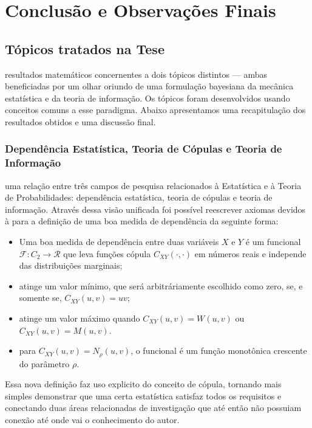 \chapter{Conclusão e Observações Finais}
\section{Tópicos tratados na Tese}

 resultados matemáticos concernentes a dois tópicos distintos --- ambas beneficiadas por um olhar oriundo de uma formulação bayesiana da mecânica estatística e da teoria de informação. Os tópicos foram desenvolvidos usando conceitos comuns a esse paradigma. Abaixo apresentamos uma recapitulação dos resultados obtidos e uma discussão final.

\subsection{Dependência Estatística, Teoria de Cópulas e Teoria de Informação}

 uma relação entre três campos de pesquisa relacionados à Estatística e à Teoria de Probabilidades: dependência estatística, teoria de cópulas e teoria de informação. Através dessa visão unificada foi possível reescrever axiomas devidos à \citet{Renyi1959} para a definição de uma boa medida de dependência da seguinte forma:
\begin{itemize}
\item Uma boa medida de dependência entre duas variáveis $X$ e $Y$ é um funcional $\mathcal{F} : C_{2} \to \mathcal{R}$ que leva funções cópula $C_{XY}(\cdot, \cdot)$ em números reais e independe das distribuições marginais;
\item atinge um valor mínimo, que será arbitráriamente escolhido como zero, se, e somente se, $C_{XY}(u,v) = uv$;
\item atinge um valor máximo quando $C_{XY}(u,v) = W(u,v)$ ou $C_{XY}(u,v) = M(u,v)$.
\item para $C_{XY}(u,v) = N_{\rho}(u,v)$, o funcional é um função monotônica crescente do parâmetro  $\rho$. 
\end{itemize}
Essa nova definição faz uso explicito do conceito de cópula, tornando mais simples demonstrar que uma certa estatística satisfaz todos os requisitos e conectando duas áreas relacionadas de investigação que até então não possuiam conexão até onde vai o conhecimento do autor. 

